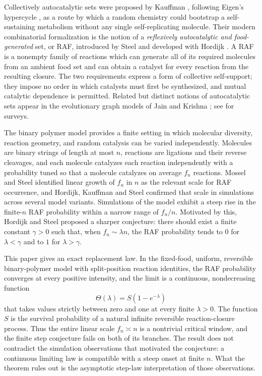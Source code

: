 \documentclass[11pt,reqno]{amsart}
\theoremstyle{plain}
\theoremstyle{definition}
\theoremstyle{remark}
\numberwithin{equation}{section}
\begin{document}
Collectively autocatalytic sets were proposed by Kauffman \cite{kauffman1986autocatalytic,kauffman1993origins}, following Eigen's hypercycle \cite{eigen1971selforganization}, as a route by which a random chemistry could bootstrap a self-sustaining metabolism without any single self-replicating molecule. Their modern combinatorial formalization is the notion of a \emph{reflexively autocatalytic and food-generated} set, or RAF, introduced by Steel \cite{steel2000emergence} and developed with Hordijk \cite{hordijk2004detecting,hordijk2015algorithms,hordijk2017chasing,steel2019autocatalytic}. A RAF is a nonempty family of reactions which can generate all of its required molecules from an ambient food set and can obtain a catalyst for every reaction from the resulting closure. The two requirements express a form of collective self-support; they impose no order in which catalysts must first be synthesized, and mutual catalytic dependence is permitted. Related but distinct notions of autocatalytic sets appear in the evolutionary graph models of Jain and Krishna \cite{jain1998autocatalytic}; see \cite{hordijk2010origin,hordijk2018basis} for surveys.

The binary polymer model \cite{kauffman1986autocatalytic,steel2000emergence,hordijk2004detecting} provides a finite setting in which molecular diversity, reaction geometry, and random catalysis can be varied independently. Molecules are binary strings of length at most $n$, reactions are ligations and their reverse cleavages, and each molecule catalyzes each reaction independently with a probability tuned so that a molecule catalyzes on average $f_n$ reactions. Mossel and Steel \cite{mossel2005random} identified linear growth of $f_n$ in $n$ as the relevant scale for RAF occurrence, and Hordijk, Kauffman and Steel \cite{hordijk2011required} confirmed that scale in simulations across several model variants. Simulations of the model exhibit a steep rise in the finite-$n$ RAF probability within a narrow range of $f_n/n$. Motivated by this, Hordijk and Steel \cite[Eq.~(21)]{hordijk2016variable} proposed a sharper conjecture: there should exist a finite constant $\gamma>0$ such that, when $f_n\sim\lambda n$, the RAF probability tends to $0$ for $\lambda<\gamma$ and to $1$ for $\lambda>\gamma$.

This paper gives an exact replacement law. In the fixed-food, uniform, reversible binary-polymer model with split-position reaction identities, the RAF probability converges at every positive intensity, and the limit is a continuous, nondecreasing function
\[
\Theta(\lambda)=S(1-e^{-\lambda})
\]
that takes values strictly between zero and one at every finite $\lambda>0$. The function $S$ is the survival probability of a natural infinite reversible reaction-closure process. Thus the entire linear scale $f_n\asymp n$ is a nontrivial critical window, and the finite step conjecture fails on both of its branches. The result does not contradict the simulation observations that motivated the conjecture: a continuous limiting law is compatible with a steep onset at finite $n$. What the theorem rules out is the asymptotic step-law interpretation of those observations.
\end{document}
